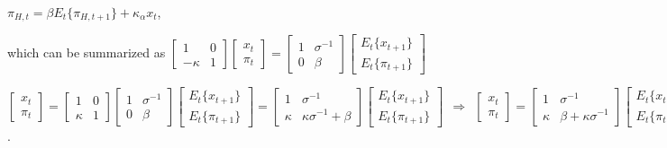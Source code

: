 \documentclass[
]{article}
\begin{document}
\(\pi_{H,t}=\beta E_t\{ \pi_{H,t+1}\} + \kappa_\alpha x_t\),

which can be summarized as
\(\displaystyle \left[ \begin{matrix} 1 & 0\\ -\kappa & 1 \end{matrix} \right] \left[ \begin{matrix} x_t\\ \pi_t \end{matrix} \right] = \left[ \begin{matrix} 1 & \sigma^{-1} \\ 0 & \beta \end{matrix} \right] \left[ \begin{matrix} E_t\{x_{t+1} \}\\ E_t \{\pi_{t+1} \} \end{matrix} \right]\)

\(\displaystyle \left[ \begin{matrix} x_t\\ \pi_t \end{matrix} \right] = \left[ \begin{matrix} 1 & 0\\ \kappa & 1 \end{matrix} \right] \left[ \begin{matrix} 1 & \sigma^{-1} \\ 0 & \beta \end{matrix} \right] \left[ \begin{matrix} E_t\{x_{t+1} \}\\ E_t \{\pi_{t+1} \} \end{matrix} \right] = \left[ \begin{matrix} 1 & \sigma^{-1} \\ \kappa & \kappa \sigma^{-1}+ \beta \end{matrix} \right] \left[ \begin{matrix} E_t\{x_{t+1} \}\\ E_t \{\pi_{t+1} \} \end{matrix} \right] \ \ \Rightarrow \ \ \left[ \begin{matrix} x_t\\ \pi_t \end{matrix} \right] = \left[ \begin{matrix} 1 & \sigma^{-1} \\ \kappa & \beta +\kappa \sigma^{-1} \end{matrix} \right] \left[ \begin{matrix} E_t\{x_{t+1} \}\\ E_t \{\pi_{t+1} \} \end{matrix} \right]\).
\end{document}
